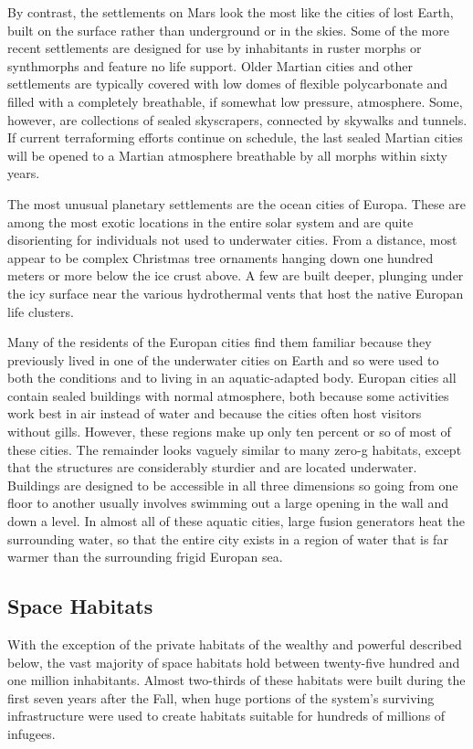 By contrast, the settlements on Mars look the most 
like the cities of lost Earth, built on the surface rather 
than underground or in the skies. Some of the more 
recent settlements are designed for use by inhabitants 
in ruster morphs or synthmorphs and feature no life 
support. Older Martian cities and other settlements 
are typically covered with low domes of flexible polycarbonate
and filled with a completely breathable, if
somewhat low pressure, atmosphere. Some, however, 
are collections of sealed skyscrapers, connected by 
skywalks and tunnels. If current terraforming efforts 
continue on schedule, the last sealed Martian cities 
will be opened to a Martian atmosphere breathable 
by all morphs within sixty years.

The most unusual planetary settlements are the 
ocean cities of Europa. These are among the most 
exotic locations in the entire solar system and are 
quite disorienting for individuals not used to underwater
cities. From a distance, most appear to be
complex Christmas tree ornaments hanging down one 
hundred meters or more below the ice crust above. A 
few are built deeper, plunging under the icy surface 
near the various hydrothermal vents that host the 
native Europan life clusters.

Many of the residents of the Europan cities find 
them familiar because they previously lived in one of 
the underwater cities on Earth and so were used to 
both the conditions and to living in an aquatic-adapted
body. Europan cities all contain sealed buildings
with normal atmosphere, both because some activities
work best in air instead of water and because the
cities often host visitors without gills. However, these 
regions make up only ten percent or so of most of 
these cities. The remainder looks vaguely similar to 
many zero-g habitats, except that the structures are 
considerably sturdier and are located underwater. 
Buildings are designed to be accessible in all three dimensions
so going from one floor to another usually
involves swimming out a large opening in the wall 
and down a level. In almost all of these aquatic cities, 
large fusion generators heat the surrounding water, so 
that the entire city exists in a region of water that is 
far warmer than the surrounding frigid Europan sea.

\subsection{Space Habitats}

With the exception of the private habitats of the 
wealthy and powerful described below, the vast majority
of space habitats hold between twenty-five hundred
and one million inhabitants. Almost two-thirds
of these habitats were built during the first seven years 
after the Fall, when huge portions of the system's 
surviving infrastructure were used to create habitats 
suitable for hundreds of millions of infugees.

